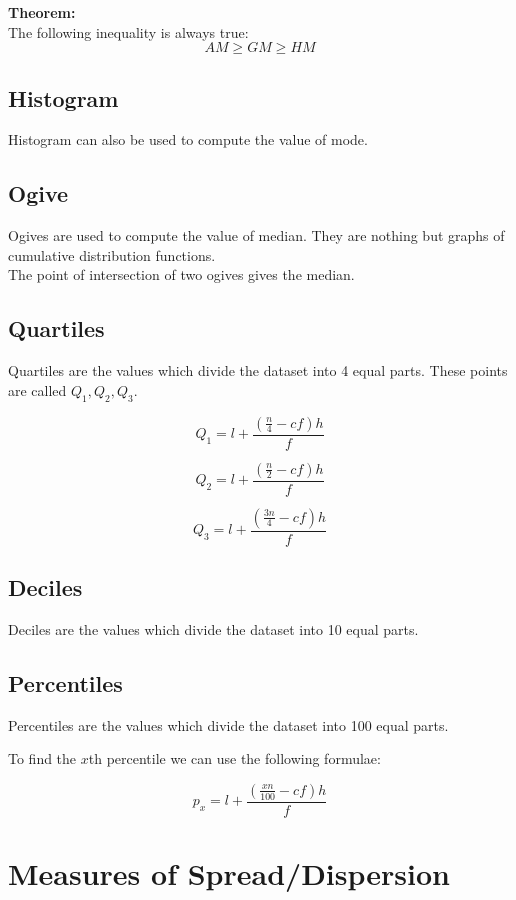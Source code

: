 \documentclass[11pt,letterpaper]{article}
\newenvironment{mytheorem}                    
        {\begin{mdframed}\textbf{Theorem:} \\}
        {\end{mdframed}}
\begin{document}
\begin{mytheorem}
   The following inequality is always true:
   \[
      AM \geq GM \geq HM
   \]
\end{mytheorem}

\subsection{Histogram}
Histogram can also be used to compute the value of mode. 

\subsection{Ogive}
Ogives are used to compute the value of median. 
They are nothing but graphs of cumulative distribution functions. \\ 
The point of intersection of two ogives gives the median. 

\subsection{Quartiles}
Quartiles are the values which divide the dataset into 4 equal parts. These points are called $ Q_1, Q_2, Q_3$. 

\[
  Q_1 = l + \frac{\left( \frac{n}{4} - cf \right)h}{f}
\]

\[
  Q_2 = l + \frac{\left( \frac{n}{2} - cf \right)h}{f}
\]

\[
  Q_3 = l + \frac{\left( \frac{3n}{4} - cf \right)h}{f}
\]
\subsection{Deciles}
Deciles are the values which divide the dataset into 10 equal parts. 

\subsection{Percentiles}
Percentiles are the values which divide the dataset into 100 equal parts. 

To find the $x$th percentile we can use the following formulae:

\[
  p_{x} =l + \frac{\left( \frac{x n}{100} - cf \right)h}{f} 
\]

\section{Measures of Spread/Dispersion}
\end{document}
